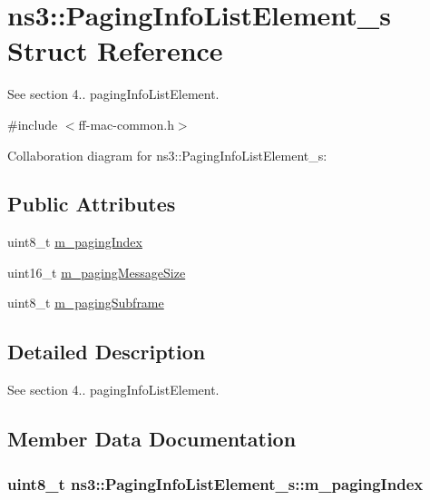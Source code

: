 \hypertarget{structns3_1_1PagingInfoListElement__s}{}\section{ns3\+:\+:Paging\+Info\+List\+Element\+\_\+s Struct Reference}
\label{structns3_1_1PagingInfoListElement__s}


See section 4.. paging\+Info\+List\+Element.  




{\ttfamily \#include $<$ff-\/mac-\/common.\+h$>$}



Collaboration diagram for ns3\+:\+:Paging\+Info\+List\+Element\+\_\+s\+:
\subsection*{Public Attributes}
\begin{DoxyCompactItemize}
\item 
uint8\+\_\+t \hyperlink{structns3_1_1PagingInfoListElement__s_ac73785080dcb75ce713c4801b8b16835}{m\+\_\+paging\+Index}
\item 
uint16\+\_\+t \hyperlink{structns3_1_1PagingInfoListElement__s_ae8aaabcb55b9ea2cc35ac41f9aa92e5b}{m\+\_\+paging\+Message\+Size}
\item 
uint8\+\_\+t \hyperlink{structns3_1_1PagingInfoListElement__s_a13b3ba2e2cb0413364b50a4d49965a10}{m\+\_\+paging\+Subframe}
\end{DoxyCompactItemize}


\subsection{Detailed Description}
See section 4.. paging\+Info\+List\+Element. 

\subsection{Member Data Documentation}
\subsubsection[{\texorpdfstring{m\+\_\+paging\+Index}{m_pagingIndex}}]{\setlength{\rightskip}{0pt plus 5cm}uint8\+\_\+t ns3\+::\+Paging\+Info\+List\+Element\+\_\+s\+::m\+\_\+paging\+Index}\hypertarget{structns3_1_1PagingInfoListElement__s_ac73785080dcb75ce713c4801b8b16835}{}\label{structns3_1_1PagingInfoListElement__s_ac73785080dcb75ce713c4801b8b16835}
